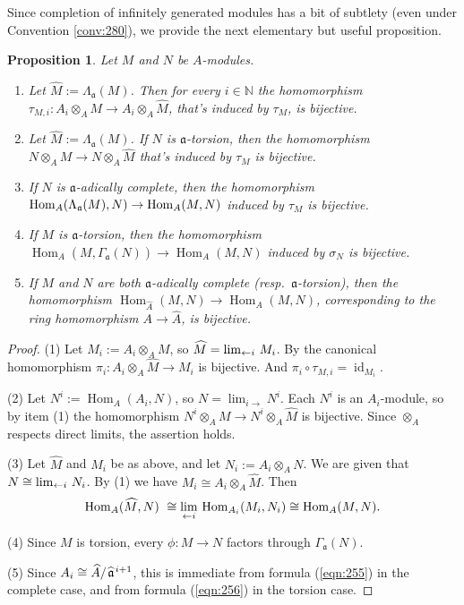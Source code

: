 \documentclass[10pt]{amsart}
\newtheorem{prop}[equation]{Proposition}
\theoremstyle{definition}
\numberwithin{equation}{section}
\newcommand{\lto}{\leftarrow}
\newcommand{\opn}{\operatorname}
\newcommand{\mfrak}[1]{\mathfrak{#1}}
\newcommand{\Ga}{\Gamma}
\newcommand{\si}{\sigma}
\newcommand{\La}{\Lambda}
\renewcommand{\a}{\mfrak{a}}
\newcommand{\N}{\mathbb{N}}
\newcommand{\ot}{\otimes}
\newcommand{\what}[1]{\widehat{#1}}
\newcommand{\lb}{\linebreak}
\newcommand{\msp}[1]{\mspace{#1 mu}}
\begin{document}
Since completion of infinitely generated modules has a bit of subtlety (even
under Convention \ref{conv:280}), we provide the next elementary but useful
proposition.

\begin{prop} \label{prop:440}
Let $M$ and $N$ be $A$-modules.
\begin{enumerate}
\item Let $\what{M} := \La_{\a}(M)$. Then for every $i \in \N$
the homomorphism $\tau_{M, i} : A_i \ot_A M \to A_i \ot_A \what{M}$, that's
induced by $\tau_M$, is bijective.

\item Let $\what{M} := \La_{\a}(M)$. If $N$ is $\a$-torsion, then the
homomorphism $N \ot_A M \to N \ot_A \what{M}$ that's induced by $\tau_M$ is
bijective.

\item If $N$ is $\a$-adically complete, then the homomorphism
$\opn{Hom}_{A}(\La_{\a}(M), N) \to \lb \opn{Hom}_{A}(M, N)$
induced by $\tau_M$ is bijective.

\item If $M$ is $\a$-torsion, then the homomorphism
$\opn{Hom}_{A}(M, \Ga_{\a}(N)) \to \opn{Hom}_{A}(M, N)$
induced by $\si_N$ is bijective.

\item If $M$ and $N$ are both $\a$-adically complete (resp.\ $\a$-torsion),
then the homomorphism
$\opn{Hom}_{\what{A}}(M, N) \to \opn{Hom}_{A}(M, N)$,
corresponding to the ring homomorphism $A \to \what{A}$, is bijective.
\end{enumerate}
\end{prop}

\begin{proof}
(1) Let $M_i := A_i \ot_A M$, so
$\what{M} = \lim_{\lto i} \msp{3} M_i$.
By \cite[Theorem 2.8]{Ye4} the canonical homomorphism
$\pi_i : A_i \ot_A \what{M} \to M_i$ is bijective.
And $\pi_i \circ \tau_{M, i} = \opn{id}_{M_i}$.

\medskip \noindent
(2) Let $N^i := \opn{Hom}_{A}(A_i, N)$, so
$N =  \lim_{i \to}  N^i$.
Each $N^i$ is an $A_i$-module, so by item (1)
the homomorphism $N^i \ot_A M \to N^i \ot_A \what{M}$ is bijective.
Since $\ot_A$ respects direct limits, the assertion holds.

\medskip \noindent (3)
Let $\what{M}$ and $M_i$ be as above, and let $N_i := A_i \ot_A N$.
We are given that $N \cong \lim_{\lto i} \msp{3} N_i$.
By (1) we have $M_i \cong A_i \ot_A \what{M}$.
Then
\[ \opn{Hom}_{A}(\what{M}, N) \
\cong \lim_{\lto i} \msp{3} \opn{Hom}_{A_i}(M_i, N_i)
\cong \opn{Hom}_{A}(M, N) . \]

\medskip \noindent
(4) Since $M$ is torsion, every $\phi : M \to N$ factors through
$\Ga_{\a}(N)$.


\medskip \noindent
(5) Since $A_i \cong \what{A} / \msp{2} \what{\a}^{\msp{2} i + 1}$,
this is immediate from formula (\ref{eqn:255}) in the complete case, and
from formula (\ref{eqn:256}) in the torsion case.
\end{proof}
\end{document}
